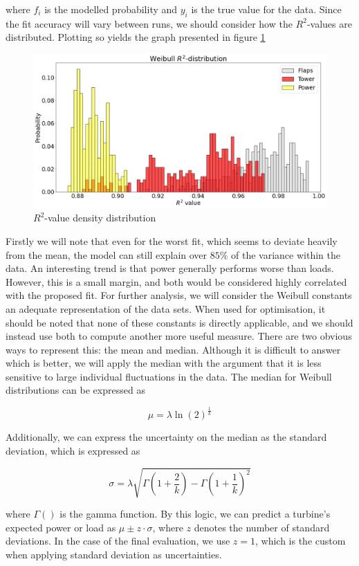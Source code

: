 where $f_i$ is the modelled probability and $y_i$ is the true value for the data. Since the fit accuracy will vary between runs, we should consider how the $R^2$-values are distributed. Plotting so yields the graph presented in figure \ref{fig:Rsquare}

\begin{figure}[H]
    \centering
    \includegraphics[scale=0.3]{Illustrations/R_2_values.png}
    \caption{$R^2$-value density distribution}
    \label{fig:Rsquare}
\end{figure}

Firstly we will note that even for the worst fit, which seems to deviate heavily from the mean, the model can still explain over $85\%$ of the variance within the data. An interesting trend is that power generally performs worse than loads. However, this is a small margin, and both would be considered highly correlated with the proposed fit. For further analysis, we will consider the Weibull constants an adequate representation of the data sets. When used for optimisation, it should be noted that none of these constants is directly applicable, and we should instead use both to compute another more useful measure. There are two obvious ways to represent this: the mean and median. Although it is difficult to answer which is better, we will apply the median with the argument that it is less sensitive to large individual fluctuations in the data. The median for Weibull distributions can be expressed as

\begin{equation}
    \mu = \lambda \ln (2)^{\frac{1}{k}}
\end{equation}

Additionally, we can express the uncertainty on the median as the standard deviation, which is expressed as

\begin{equation}
    \sigma = \lambda\sqrt{\Gamma\left(1+\frac{2}{k}\right)-\Gamma\left(1+\frac{1}{k}\right)^2}
\end{equation}

where $\Gamma()$ is the gamma function. By this logic, we can predict a turbine's expected power or load as $\mu \pm z \cdot \sigma$, where $z$ denotes the number of standard deviations. In the case of the final evaluation, we use $z=1$, which is the custom when applying standard deviation as uncertainties. 

